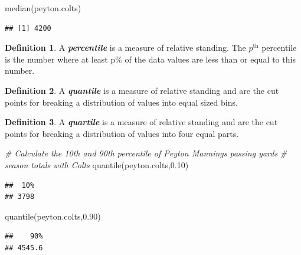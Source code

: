 \documentclass[
  11pt,
]{book}
\newenvironment{Shaded}{\begin{snugshade}}{\end{snugshade}}
\newcommand{\CommentTok}[1]{\textcolor[rgb]{0.56,0.35,0.01}{\textit{#1}}}
\newcommand{\FloatTok}[1]{\textcolor[rgb]{0.00,0.00,0.81}{#1}}
\newcommand{\FunctionTok}[1]{\textcolor[rgb]{0.00,0.00,0.00}{#1}}
\newcommand{\NormalTok}[1]{#1}
\theoremstyle{definition}
\newtheorem{definition}{Definition}[chapter]
\theoremstyle{definition}
\theoremstyle{definition}
\theoremstyle{definition}
\theoremstyle{remark}
\begin{document}
\begin{Shaded}
\begin{Highlighting}[]
\FunctionTok{median}\NormalTok{(peyton.colts)}
\end{Highlighting}
\end{Shaded}

\begin{verbatim}
## [1] 4200
\end{verbatim}

\vfill
\newpage

\begin{definition}
A \textbf{\emph{percentile}} is a measure of relative standing. The \(p^\text{th}\) percentile is the number where at least
p\% of the data values are less than or equal to this number.
\end{definition}

\begin{definition}
A \textbf{\emph{quantile}} is a measure of relative standing and are the cut points for breaking a distribution of values into equal sized bins.
\end{definition}

\begin{definition}
A \textbf{\emph{quartile}} is a measure of relative standing and are the cut points for breaking a distribution of values into four equal parts.
\end{definition}

\begin{Shaded}
\begin{Highlighting}[]
\CommentTok{\# Calculate the 10th and 90th percentile of Peyton Manning\textquotesingle{}s passing yards }
\CommentTok{\# season totals with Colts}
\FunctionTok{quantile}\NormalTok{(peyton.colts,}\FloatTok{0.10}\NormalTok{)}
\end{Highlighting}
\end{Shaded}

\begin{verbatim}
##  10% 
## 3798
\end{verbatim}

\begin{Shaded}
\begin{Highlighting}[]
\FunctionTok{quantile}\NormalTok{(peyton.colts,}\FloatTok{0.90}\NormalTok{)}
\end{Highlighting}
\end{Shaded}

\begin{verbatim}
##    90% 
## 4545.6
\end{verbatim}
\end{document}
